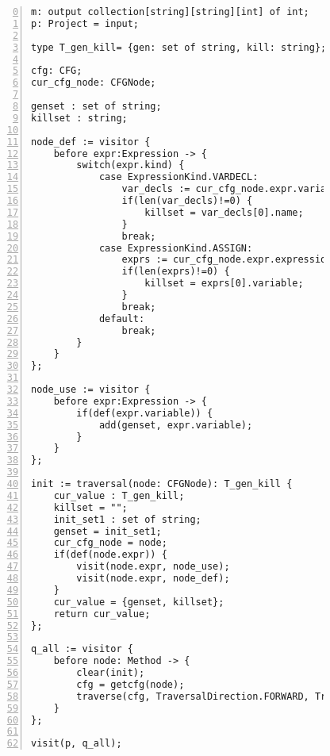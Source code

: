\begin{figure}[ht!]
\begin{lstlisting}[numbers=left, tabsize=4, escapechar=@, caption={Used defined variable},label={lst:udv-code},firstline=0, firstnumber=0, lastline = 55] 
m: output collection[string][string][int] of int;
p: Project = input;

type T_gen_kill= {gen: set of string, kill: string};

cfg: CFG;
cur_cfg_node: CFGNode;

genset : set of string;
killset : string;

node_def := visitor {
	before expr:Expression -> {
		switch(expr.kind) {
			case ExpressionKind.VARDECL: 
				var_decls := cur_cfg_node.expr.variable_decls;
				if(len(var_decls)!=0) {
					killset = var_decls[0].name;
				}				
				break;
			case ExpressionKind.ASSIGN: 
				exprs := cur_cfg_node.expr.expressions;
				if(len(exprs)!=0) {				
					killset = exprs[0].variable;
				}
				break;
			default:
				break;
		}
	}
};

node_use := visitor {
	before expr:Expression -> {
		if(def(expr.variable)) {
			add(genset, expr.variable);			
		}
	}
};

init := traversal(node: CFGNode): T_gen_kill {
	cur_value : T_gen_kill;
	killset = "";
	init_set1 : set of string;
	genset = init_set1;
	cur_cfg_node = node;
	if(def(node.expr)) {
		visit(node.expr, node_use);
		visit(node.expr, node_def);
	}
	cur_value = {genset, killset};
	return cur_value;
};

q_all := visitor {
	before node: Method -> {			
		clear(init);
		cfg = getcfg(node);
		traverse(cfg, TraversalDirection.FORWARD, TraversalKind.HYBRID, init);
	}
};

visit(p, q_all);
\end{lstlisting}
\end{figure}